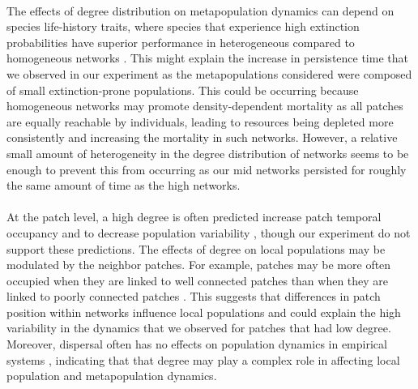 \paragraph*{}

The effects of degree distribution on metapopulation dynamics can depend on species life-history traits, where species that experience high extinction probabilities have superior performance in heterogeneous compared to homogeneous networks \parencite{gilarranz2012}. This might explain the increase in persistence time that we observed in our experiment as the metapopulations considered were composed of small extinction-prone populations. This could be occurring because homogeneous networks may promote density-dependent mortality as all patches are equally reachable by individuals, leading to resources being depleted more consistently and increasing the mortality in such networks. However, a relative small amount of heterogeneity in the degree distribution of networks seems to be enough to prevent this from occurring as our mid networks persisted for roughly the same amount of time as the high networks. 

\paragraph*{}
At the patch level, a high degree is often predicted increase patch temporal occupancy and to decrease population variability \parencite{gilarranz2012,arancibia2024}, though our experiment do not support these predictions. The effects of degree on local populations may be modulated by the neighbor patches. For example, patches may be more often occupied when they are linked to well connected patches than when they are linked to poorly connected patches \parencite{gilarranz2012}. This suggests that differences in patch position within networks influence local populations and could explain the high variability in the dynamics that we observed for patches that had low degree. Moreover, dispersal often has no effects on population dynamics in empirical systems \parencite{yang2022}, indicating that that degree may play a complex role in affecting local population and metapopulation dynamics. 
